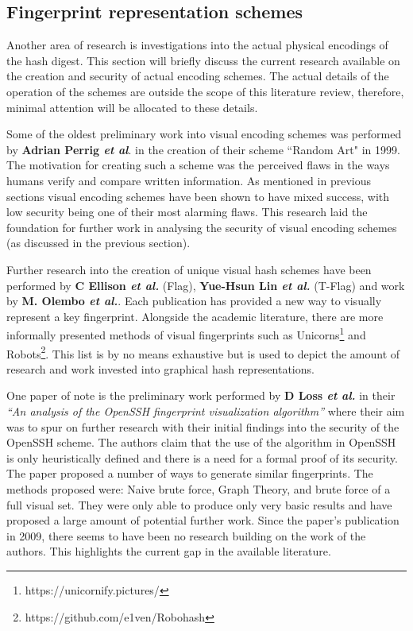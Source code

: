 \subsection{Fingerprint representation schemes}
Another area of research is investigations into the actual physical encodings of the hash digest. This section will briefly discuss the current research available on the creation and security of actual encoding schemes. The actual details of the operation of the schemes are outside the scope of this literature review, therefore, minimal attention will be allocated to these details.

Some of the oldest preliminary work into visual encoding schemes was performed by \textbf{Adrian Perrig \textit{et al}}\cite{perrig1999hash}. in the creation of their scheme ``Random Art" in 1999. The motivation for creating such a scheme was the perceived flaws in the ways humans verify and compare written information. As mentioned in previous sections visual encoding schemes have been shown to have mixed success, with low security being one of their most alarming flaws. This research laid the foundation for further work in analysing the security of visual encoding schemes (as discussed in the previous section).

Further research into the creation of unique visual hash schemes have been performed by \textbf{C Ellison \textit{et al.}} \cite{ellison2003public} (Flag), \textbf{Yue-Hsun Lin \textit{et al.}}\cite{lin2010spate} (T-Flag) and work by \textbf{M.  Olembo \textit{et al.}}\cite{olembo2013developing}. Each publication has provided a new way to visually represent a key fingerprint. Alongside the academic literature, there are more informally presented methods of visual fingerprints such as Unicorns\footnote{https://unicornify.pictures/} and Robots\footnote{https://github.com/e1ven/Robohash}. This list is by no means exhaustive but is used to depict the amount of research and work invested into graphical hash representations.

One paper of note is the preliminary work performed by \textbf{D Loss \textit{et al.}}\cite{loss2009drunken} in their \textit{``An analysis of the OpenSSH fingerprint visualization algorithm''} where their aim was to spur on further research with their initial findings into the security of the OpenSSH scheme. The authors claim that the use of the algorithm in OpenSSH is only heuristically defined and there is a need for a formal proof of its security. \\
The paper proposed a number of ways to generate similar fingerprints. The methods proposed were: Naive brute force, Graph Theory, and brute force of a full visual set. They were only able to produce only very basic results and have proposed a large amount of potential further work. Since the paper's publication in 2009, there seems to have been no research building on the work of the authors. This highlights the current gap in the available literature.

